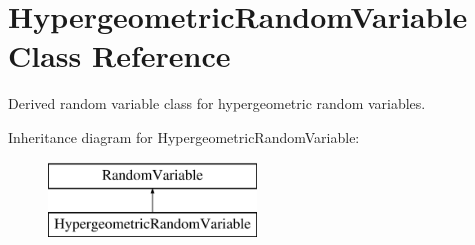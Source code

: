 \section{Hypergeometric\+Random\+Variable Class Reference}
\label{classPecos_1_1HypergeometricRandomVariable}


Derived random variable class for hypergeometric random variables.  


Inheritance diagram for Hypergeometric\+Random\+Variable\+:\begin{figure}[H]
\begin{center}
\leavevmode
\includegraphics[height=2.000000cm]{classPecos_1_1HypergeometricRandomVariable}
\end{center}
\end{figure}
